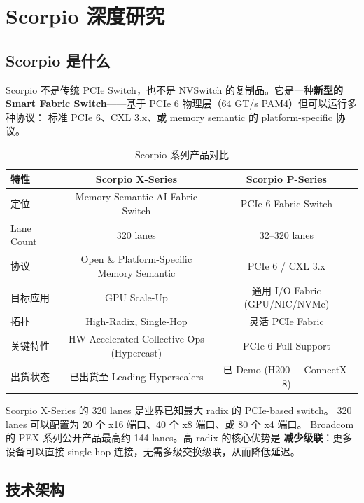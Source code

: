 
\section{Scorpio 深度研究}

\subsection{Scorpio 是什么}

Scorpio 不是传统 PCIe Switch，也不是 NVSwitch 的复制品。它是一种\textbf{新型的 Smart Fabric Switch}——基于 PCIe 6 物理层（64 GT/s PAM4）但可以运行多种协议：
标准 PCIe 6、CXL 3.x、或 memory semantic 的 platform-specific 协议。

\begin{table}[htb]
    \centering
    \caption{Scorpio 系列产品对比}
    \label{tab:scorpio}
    \begin{tabular}{lcc}
        \toprule
        \textbf{特性} & \textbf{Scorpio X-Series} & \textbf{Scorpio P-Series} \\
        \midrule
        定位 & Memory Semantic AI Fabric Switch & PCIe 6 Fabric Switch \\
        Lane Count & 320 lanes & 32–320 lanes \\
        协议 & Open \& Platform-Specific Memory Semantic & PCIe 6 / CXL 3.x \\
        目标应用 & GPU Scale-Up & 通用 I/O Fabric (GPU/NIC/NVMe) \\
        拓扑 & High-Radix, Single-Hop & 灵活 PCIe Fabric \\
        关键特性 & HW-Accelerated Collective Ops (Hypercast) & PCIe 6 Full Support \\
        出货状态 & 已出货至 Leading Hyperscalers & 已 Demo (H200 + ConnectX-8) \\
        \bottomrule
    \end{tabular}
\end{table}

Scorpio X-Series 的 320 lanes 是业界已知最大 radix 的 PCIe-based switch。
320 lanes 可以配置为 20 个 x16 端口、40 个 x8 端口、或 80 个 x4 端口。
Broadcom 的 PEX 系列公开产品最高约 144 lanes。高 radix 的核心优势是
\textbf{减少级联}：更多设备可以直接 single-hop 连接，无需多级交换级联，从而降低延迟。

\subsection{技术架构}

